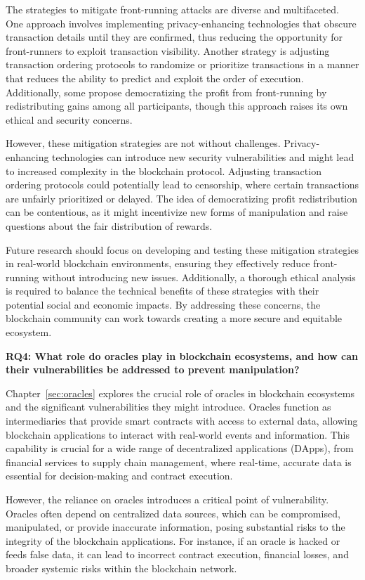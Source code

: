 The strategies to mitigate front-running attacks are diverse and multifaceted. One approach involves implementing privacy-enhancing technologies that obscure transaction details until they are confirmed, thus reducing the opportunity for front-runners to exploit transaction visibility. Another strategy is adjusting transaction ordering protocols to randomize or prioritize transactions in a manner that reduces the ability to predict and exploit the order of execution. Additionally, some propose democratizing the profit from front-running by redistributing gains among all participants, though this approach raises its own ethical and security concerns.

However, these mitigation strategies are not without challenges. Privacy-enhancing technologies can introduce new security vulnerabilities and might lead to increased complexity in the blockchain protocol. Adjusting transaction ordering protocols could potentially lead to censorship, where certain transactions are unfairly prioritized or delayed. The idea of democratizing profit redistribution can be contentious, as it might incentivize new forms of manipulation and raise questions about the fair distribution of rewards.

Future research should focus on developing and testing these mitigation strategies in real-world blockchain environments, ensuring they effectively reduce front-running without introducing new issues. Additionally, a thorough ethical analysis is required to balance the technical benefits of these strategies with their potential social and economic impacts. By addressing these concerns, the blockchain community can work towards creating a more secure and equitable ecosystem.


\textbf{RQ4: What role do oracles play in blockchain ecosystems, and how can their vulnerabilities be addressed to prevent manipulation?}

Chapter~\ref{sec:oracles} explores the crucial role of oracles in blockchain ecosystems and the significant vulnerabilities they might introduce. Oracles function as intermediaries that provide smart contracts with access to external data, allowing blockchain applications to interact with real-world events and information. This capability is crucial for a wide range of decentralized applications (DApps), from financial services to supply chain management, where real-time, accurate data is essential for decision-making and contract execution.

However, the reliance on oracles introduces a critical point of vulnerability. Oracles often depend on centralized data sources, which can be compromised, manipulated, or provide inaccurate information, posing substantial risks to the integrity of the blockchain applications. For instance, if an oracle is hacked or feeds false data, it can lead to incorrect contract execution, financial losses, and broader systemic risks within the blockchain network.

